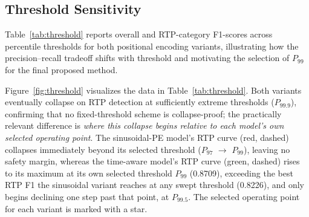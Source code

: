 \subsection{Threshold Sensitivity}
\label{sec:threshold}
Table~\ref{tab:threshold} reports overall and RTP-category F1-scores across percentile thresholds for both positional encoding variants, illustrating how the precision--recall tradeoff shifts with threshold and motivating the selection of $P_{99}$ for the final proposed method.

\begin{table}[!htbp]
\centering
\caption{Threshold sensitivity, sinusoidal (baseline) vs.\ time-aware (proposed) positional encoding---both on the fixed Transformer-CNN backbone---evaluated at five percentile thresholds. Overall F1: micro-avg (all 27 files); RTP F1: macro-avg (5 RTP files).}
\label{tab:threshold}
\small
{}
\end{table}
Figure~\ref{fig:threshold} visualizes the data in Table~\ref{tab:threshold}. Both variants eventually collapse on RTP detection at sufficiently extreme thresholds ($P_{99.9}$), confirming that no fixed-threshold scheme is collapse-proof; the practically relevant difference is \emph{where this collapse begins relative to each model's own selected operating point}. The sinusoidal-PE model's RTP curve (red, dashed) collapses immediately beyond its selected threshold ($P_{97}$ $\rightarrow$ $P_{99}$), leaving no safety margin, whereas the time-aware model's RTP curve (green, dashed) rises to its maximum at its own selected threshold $P_{99}$ (0.8709), exceeding the best RTP F1 the sinusoidal variant reaches at any swept threshold (0.8226), and only begins declining one step past that point, at $P_{99.5}$. The selected operating point for each variant is marked with a star.

